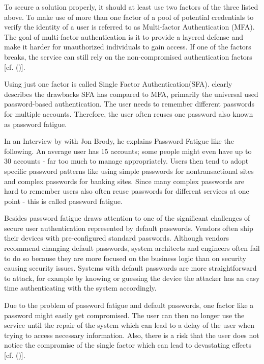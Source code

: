 To secure a solution properly, it should at least use two factors of the three listed above. To make use of more than one factor of a pool of potential credentials to verify the identity of a user is referred to as Multi-factor Authentication (MFA). The goal of multi-factor authentication is it to provide a layered defense and make it harder for unauthorized individuals to gain access. If one of the factors breaks, the service can still rely on the non-compromised authentication factors [cf. (\cite{Dasgupta:2017:AUA})].

Using just one factor is called Single Factor Authentication(SFA). \cite{Dasgupta:2017:AUA} clearly describes the drawbacks SFA has compared to MFA, primarily the universal used password-based authentication. The user needs to remember different passwords for multiple accounts. Therefore, the user often reuses one password also known as password fatigue.

In an Interview by \cite{Tomkins:2009:DPF} with Jon Brody, he explains Password Fatigue like the following. An average user has 15 accounts; some people might even have up to 30 accounts - far too much to manage appropriately. Users then tend to adopt specific password patterns like using simple passwords for nontransactional sites and complex passwords for banking sites. Since many complex passwords are hard to remember users also often reuse passwords for different services at one point - this is called password fatigue. 

Besides password fatigue \cite{Todorov:2007:MUI} draws attention to one of the significant challenges of secure user authentication represented by default passwords. Vendors often ship their devices with pre-configured standard passwords. Although vendors recommend changing default passwords, system architects and engineers often fail to do so because they are more focused on the business logic than on security causing security issues. Systems with default passwords are more straightforward to attack, for example by knowing or guessing the device the attacker has an easy time authenticating with the system accordingly. 


Due to the problem of password fatigue and default passwords, one factor like a password might easily get compromised. The user can then no longer use the service until the repair of the system which can lead to a delay of the user when trying to access necessary information. Also, there is a risk that the user does not notice the compromise of the single factor which can lead to devastating effects [cf. (\cite{Dasgupta:2017:AUA})]. 

